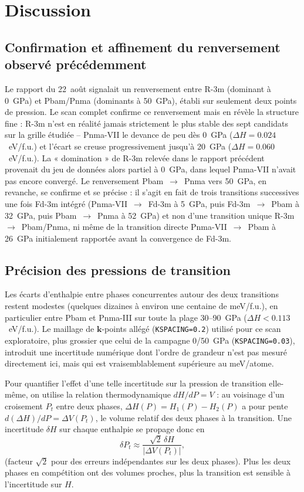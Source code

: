 \documentclass[11pt,a4paper]{article}
\begin{document}
\section{Discussion}

\subsection{Confirmation et affinement du renversement observé précédemment}

Le rapport du 22~août signalait un renversement entre R-3m (dominant à 0~GPa) et Pbam/Pnma
(dominants à 50~GPa), établi sur seulement deux points de pression. Le scan complet confirme ce
renversement mais en révèle la structure fine : R-3m n'est en réalité jamais strictement le
plus stable des sept candidats sur la grille étudiée -- Pnma-VII le devance de peu dès 0~GPa
($\Delta H = 0.024$~eV/f.u.) et l'écart se creuse progressivement jusqu'à 20~GPa
($\Delta H = 0.060$~eV/f.u.). La
« domination » de R-3m relevée dans le rapport précédent provenait du jeu de données alors
partiel à 0~GPa, dans lequel Pnma-VII n'avait pas encore convergé. Le renversement
Pbam~$\to$~Pnma vers 50~GPa, en revanche, se confirme et se précise : il s'agit en fait de trois
transitions successives une fois Fd-3m intégré (Pnma-VII~$\to$~Fd-3m à 5~GPa, puis
Fd-3m~$\to$~Pbam à 32~GPa, puis Pbam~$\to$~Pnma à 52~GPa) et non d'une transition unique
R-3m~$\to$~Pbam/Pnma, ni même de la transition directe Pnma-VII~$\to$~Pbam à 26~GPa initialement
rapportée avant la convergence de Fd-3m.

\subsection{Précision des pressions de transition}
\label{sec:precision}

Les écarts d'enthalpie entre phases concurrentes autour des deux transitions restent modestes
(quelques dizaines à environ une centaine de meV/f.u.), en particulier entre Pbam et Pnma-III
sur toute la plage 30--90~GPa ($\Delta H < 0.113$~eV/f.u.). Le maillage de
$\mathbf{k}$-points allégé (\texttt{KSPACING=0.2}) utilisé pour ce scan exploratoire, plus
grossier que celui de la campagne 0/50~GPa (\texttt{KSPACING=0.03}), introduit une incertitude
numérique dont l'ordre de grandeur n'est pas mesuré directement ici, mais qui est vraisemblablement
supérieure au meV/atome.

Pour quantifier l'effet d'une telle incertitude sur la pression de transition elle-même, on
utilise la relation thermodynamique $dH/dP = V$ : au voisinage d'un croisement $P_t$ entre deux
phases, $\Delta H(P) = H_1(P) - H_2(P)$ a pour pente $d(\Delta H)/dP = \Delta V(P_t)$, le volume
relatif des deux phases à la transition. Une incertitude $\delta H$ sur chaque enthalpie se
propage donc en
\[
\delta P_t \approx \frac{\sqrt{2}\,\delta H}{|\Delta V(P_t)|},
\]
(facteur $\sqrt2$ pour des erreurs indépendantes sur les deux phases). Plus les deux phases en
compétition ont des volumes proches, plus la transition est sensible à l'incertitude sur $H$.
\end{document}
